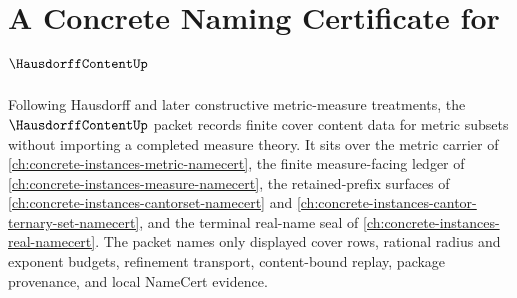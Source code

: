\chapter{A Concrete Naming Certificate for $\HausdorffContentUp$}
\label{ch:concrete-instances-hausdorff-content-namecert}

Following Hausdorff and later constructive metric-measure treatments, the $\HausdorffContentUp$ packet records finite cover content data for metric subsets without importing a completed measure theory. It sits over the metric carrier of \autoref{ch:concrete-instances-metric-namecert}, the finite measure-facing ledger of \autoref{ch:concrete-instances-measure-namecert}, the retained-prefix surfaces of \autoref{ch:concrete-instances-cantorset-namecert} and \autoref{ch:concrete-instances-cantor-ternary-set-namecert}, and the terminal real-name seal of \autoref{ch:concrete-instances-real-namecert}. The packet names only displayed cover rows, rational radius and exponent budgets, refinement transport, content-bound replay, package provenance, and local NameCert evidence.

